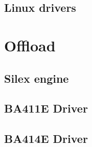 \subsection{Linux drivers}

\section{Offload}

\subsection{Silex engine}

\subsection{BA411E Driver}

\subsection{BA414E Driver}